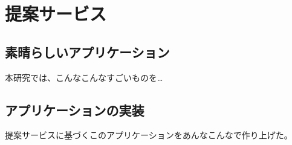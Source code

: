 \section{提案サービス}
\subsection{素晴らしいアプリケーション}
本研究では、こんなこんなすごいものを…


\subsection{アプリケーションの実装}
提案サービスに基づくこのアプリケーションをあんなこんなで作り上げた。